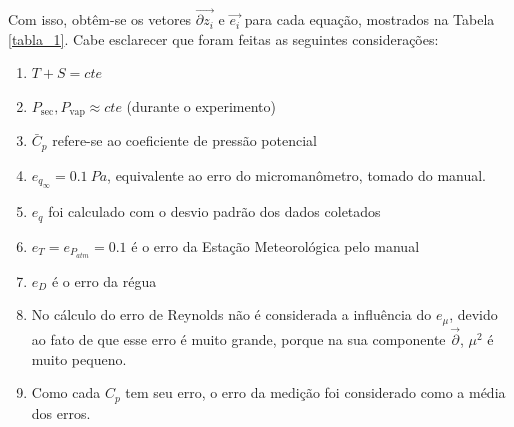 Com isso, obtêm-se os vetores $\vec{\partial z_{i}}$ e $\vec{e_{i}}$ para cada equação, mostrados na Tabela \ref{tabla_1}. Cabe esclarecer que foram feitas as seguintes considerações:
\begin{enumerate}
    \item $ T + S = cte$
    \item $P_{\text{sec}} , P_{\text{vap}} \approx cte$ (durante o experimento)
    \item $\bar{C}_{p}$ refere-se ao coeficiente de pressão potencial
    \item $e_{q_{\infty}} = 0.1 ~ Pa$, equivalente ao erro do micromanômetro, tomado do manual.
    \item $e_q$ foi calculado com o desvio padrão dos dados coletados
    \item $e_{T} = e_{P_{atm}} = 0.1$ é o erro da Estação Meteorológica pelo manual
    \item $e_{D}$ é o erro da régua
    \item No cálculo do erro de Reynolds não é considerada a influência do $e_{\mu}$, devido ao fato de que esse erro é muito grande, porque na sua componente $\vec{   \partial }$,  $\mu^2$ é muito pequeno.
    \item Como cada $C_p$ tem seu erro, o erro da medição foi considerado como a média dos erros.


\end{enumerate}


